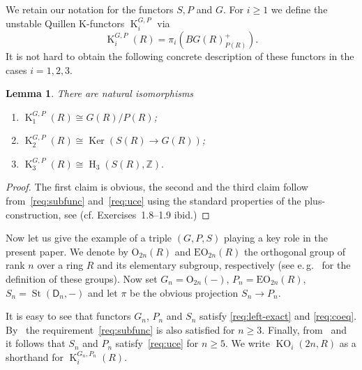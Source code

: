 \documentclass[oneside, 8pt]{amsart}
\newtheorem{lemma}{Lemma}
\theoremstyle{remark}
\theoremstyle{definition}
\numberwithin{lemma}{section}
\numberwithin{prop}{section}
\numberwithin{corollary}{section}
\DeclareMathOperator{\Ker}{Ker}
\DeclareMathOperator{\St}{St}
\DeclareMathOperator{\HH}{H}
\DeclareMathOperator{\K}{K}
\DeclareMathOperator{\KO}{KO}
\newcommand{\ZZ}{\mathbb{Z}}
\newcommand{\rD}{\mathsf{D}}
\numberwithin{equation}{section}
\begin{document}
We retain our notation for the functors $S, P$ and $G$.
For $i\geq 1$ we define the unstable Quillen K-functors $\K_{i}^{G, P}$ via
\[ \K_i^{G,P}(R) = \pi_i(BG(R)^+_{P(R)}). \]
It is not hard to obtain the following concrete description of these functors in the cases $i=1,2,3$.
\begin{lemma}\label{lem:lowerKgroups} There are natural isomorphisms \begin{enumerate}
 \item $\K_1^{G,P}(R) \cong G(R) / P(R)$;
 \item $\K_2^{G,P}(R) \cong \Ker(S(R) \to G(R))$;
 \item $\K_3^{G,P}(R) \cong \HH_3(S(R), \ZZ).$ \end{enumerate} \end{lemma}
\begin{proof} The first claim is obvious, the second and the third claim follow from~\ref{req:subfunc} and~\ref{req:uce} using the standard properties of the plus-construction, see \cite[\S~IV.1]{Kbook}   (cf. Exercises~1.8--1.9 ibid.) \end{proof}

Now let us give the example of a triple $(G, P, S)$ playing a key role in the present paper.
We denote by $\mathrm{O}_{2n}(R)$ and $\mathrm{EO}_{2n}(R)$ the orthogonal group of rank $n$ over a ring $R$ and its elementary subgroup, respectively
 (see e.\,g.~\cite{Su82} for the definition of these groups).
Now set $G_n = \mathrm{O}_{2n}(-)$, $P_n = \mathrm{EO}_{2n}(R)$, $S_n = \St(\rD_n, -)$ and let $\pi$ be the obvious projection $S_n \to P_n$.

It is easy to see that functors $G_n$, $P_n$ and $S_n$ satisfy \ref{req:left-exact} and \ref{req:coeq}.
By~\cite{Su82} the requirement~\ref{req:subfunc} is also satisfied for $n \geq 3$.
Finally, from~\cite[Corollary~5.4]{St71} and~\cite[Theorem~1]{LS17} it follows that $S_n$ and $P_n$ satisfy~\ref{req:uce} for $n \geq 5$.
We write $\KO_i(2n, R)$ as a shorthand for $\K_i^{G_n, P_n}(R)$.

\begin{comment}
In the above definition we could have replaced the group $\mathrm{O}_{2n}$ with a different isogeneous form of the orthogonal group, e.\,g. 
 we could have chosen $G_n = \mathrm{SO}_{2n}$ or $G_n = \mathrm{Spin}_{2n}$ and then have defined $P_n$ as its elementary subfunctor.
Of course, this would change the functors $\K_i(G_n, P_n, -)$ for $i=1,2$ however, as the proof of~\cref{characterization} suggests
 it would not change $\K_3(G_n, P_n, -)$.
\end{comment}
\end{document}

